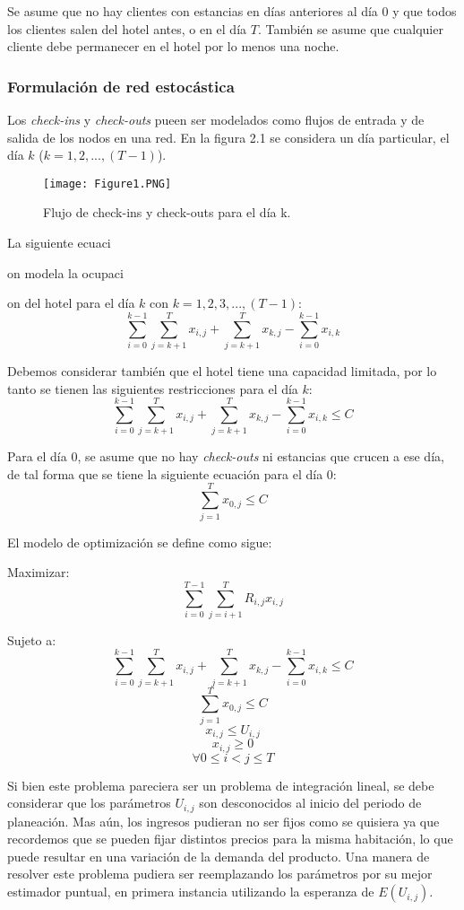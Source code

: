 {Se asume que no hay clientes con estancias en días anteriores al día 0 y que todos los clientes salen del hotel antes, o en el día $T$. También se asume que cualquier cliente debe permanecer en el hotel por lo menos una noche.

\subsubsection*{Formulación de red estocástica}

Los \emph{check-ins} y \emph{check-outs} pueen ser modelados como flujos de entrada y de salida de los nodos en una red. En la figura 2.1 se considera un día particular, el día $k$ ($k={1,2,...,(T-1)}$).

\begin{figure}
  \texttt{[image: Figure1.PNG]}
  \caption{Flujo de check-ins y check-outs para el día k.}
  \label{fig:Figure2.1}
\end{figure}

La siguiente ecuaci{on modela la ocupaci{on del hotel para el día $k$ con $k = 1,2,3,...,(T-1)$:$$\sum_{i=0}^{k-1}\sum_{j=k+1}^{T} x_{i,j} + \sum_{j=k+1}^{T} x_{k,j} - \sum_{i=0}^{k-1} x_{i,k}$$

Debemos considerar también que el hotel tiene una capacidad limitada, por lo tanto se tienen las siguientes restricciones para el día $k$:
$$\sum_{i=0}^{k-1}\sum_{j=k+1}^{T} x_{i,j} + \sum_{j=k+1}^{T} x_{k,j} - \sum_{i=0}^{k-1} x_{i,k} \leq C$$

Para el día 0, se asume que no hay \emph{check-outs} ni estancias que crucen a ese día, de tal forma que se tiene la siguiente ecuación para el día 0: 
$$\sum_{j=1}^{T} x_{0,j} \leq C$$

El modelo de optimización se define como sigue:

Maximizar: $$\sum_{i=0}^{T-1}\sum_{j=i+1}^{T} R_{i,j}x_{i,j}$$

Sujeto a: $$\sum_{i=0}^{k-1}\sum_{j=k+1}^{T} x_{i,j} + \sum_{j=k+1}^{T} x_{k,j} - \sum_{i=0}^{k-1} x_{i,k} \leq C$$
$$\sum_{j=1}^{T} x_{0,j} \leq C$$
$$x_{i,j} \leq U_{i,j}$$
$$x_{i,j} \geq 0$$
$$\forall 0\leq i < j \leq T$$

Si bien este problema pareciera ser un problema de integración lineal, se debe considerar que los parámetros $U_{i,j}$ son desconocidos al inicio del periodo de planeación. Mas aún, los ingresos pudieran no ser fijos como se quisiera ya que recordemos que se pueden fijar distintos precios para la misma habitación, lo que puede resultar en una variación de la demanda del producto. Una manera de resolver este problema pudiera ser reemplazando los parámetros por su mejor estimador puntual, en primera instancia utilizando la esperanza de $E(U_{i,j})$.

}}}
